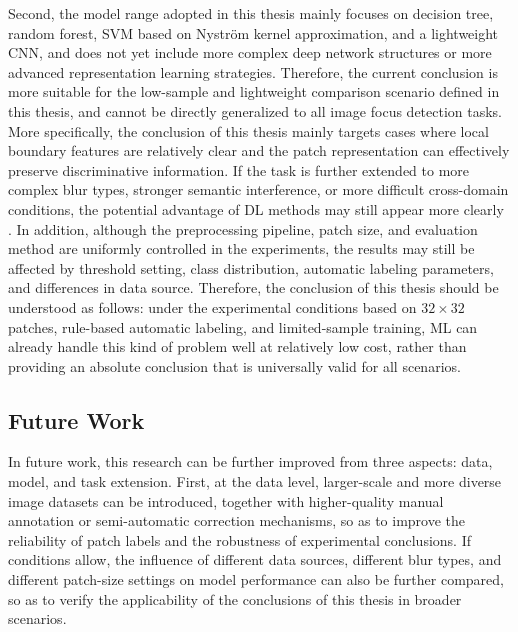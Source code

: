 \par Second, the model range adopted in this thesis mainly focuses on decision
tree, random forest, SVM based on Nystr\"{o}m kernel approximation, and a
lightweight CNN, and does not yet include more complex deep network structures
or more advanced representation learning strategies. Therefore, the current
conclusion is more suitable for the low-sample and lightweight comparison
scenario defined in this thesis, and cannot be directly generalized to all image
focus detection tasks. More specifically, the conclusion of this thesis mainly
targets cases where local boundary features are relatively clear and the patch
representation can effectively preserve discriminative information. If the task
is further extended to more complex blur types, stronger semantic interference,
or more difficult cross-domain conditions, the potential advantage of DL methods
may still appear more clearly \cite{goodfellow2016deep,shorten2019survey}. In addition, although the preprocessing pipeline,
patch size, and evaluation method are uniformly controlled in the experiments,
the results may still be affected by threshold setting, class distribution,
automatic labeling parameters, and differences in data source. Therefore, the
conclusion of this thesis should be understood as follows: under the
experimental conditions based on $32\times32$ patches, rule-based automatic
labeling, and limited-sample training, ML can already handle this kind of
problem well at relatively low cost, rather than providing an absolute
conclusion that is universally valid for all scenarios.

\subsection{Future Work}
\par In future work, this research can be further improved from three aspects:
data, model, and task extension. First, at the data level, larger-scale and more
diverse image datasets can be introduced, together with higher-quality manual
annotation or semi-automatic correction mechanisms, so as to improve the
reliability of patch labels and the robustness of experimental conclusions. If
conditions allow, the influence of different data sources, different blur types,
and different patch-size settings on model performance can also be further
compared, so as to verify the applicability of the conclusions of this thesis in
broader scenarios.

